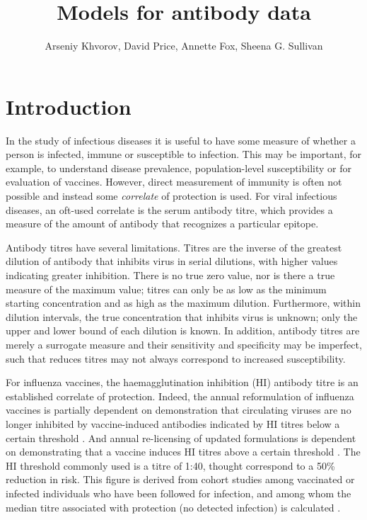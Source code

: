\documentclass[12pt]{article}
\title{Models for antibody data}
\author{Arseniy Khvorov, David Price, Annette Fox, Sheena G. Sullivan}
\begin{document}
\maketitle


\section{Introduction}

In the study of infectious diseases it is useful to have some measure of whether a person is infected, immune or susceptible to infection. This may be important, for example, to understand disease prevalence, population-level susceptibility or for evaluation of vaccines.  However, direct measurement of immunity is often not possible and instead some \textit{correlate} of protection is used. For viral infectious diseases, an oft-used correlate is the serum antibody titre, which provides a measure of the amount of antibody that recognizes a particular epitope. 

Antibody titres have several limitations. Titres are the inverse of the greatest dilution of antibody that inhibits virus in serial dilutions, with higher values indicating greater inhibition. There is no true zero value, nor is there a true measure of the maximum value; titres can only be as low as the minimum starting concentration and as high as the maximum dilution.  Furthermore, within dilution intervals, the true concentration that inhibits virus is unknown; only the upper and lower bound of each dilution is known. In addition, antibody titres are merely a surrogate measure and their sensitivity and specificity may be imperfect, such that reduces titres may not always correspond to increased susceptibility. 

For influenza vaccines, the haemagglutination inhibition (HI) antibody titre is an established correlate of protection. Indeed, the annual reformulation of influenza vaccines is partially dependent on demonstration that circulating viruses are no longer inhibited by vaccine-induced antibodies indicated by HI titres below a certain threshold \citep{Barr;2014}. And annual re-licensing of updated formulations is dependent on demonstrating that a vaccine induces HI titres above a certain threshold \citep{Wood;2003}.  The HI threshold commonly used is a titre of 1:40, thought correspond to a 50\% reduction in risk. This figure is derived from cohort studies among vaccinated or infected individuals who have been followed for infection, and among whom the median titre associated with protection (no detected infection) is calculated \citep{Hobson;1972}\citep{Ng;2013}. 
\end{document}
